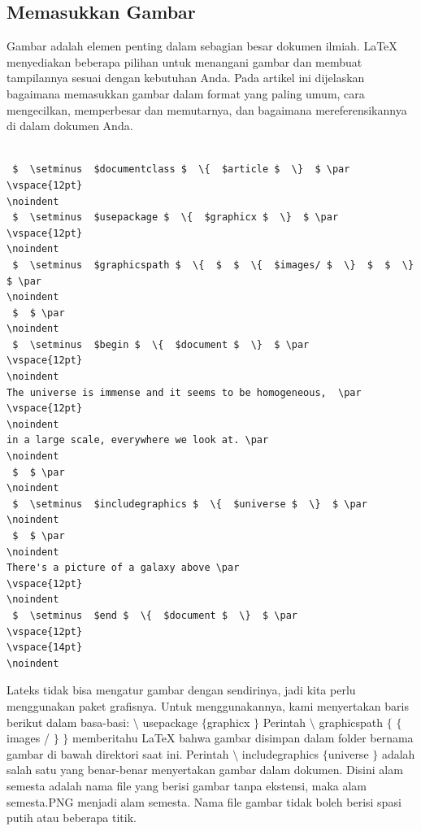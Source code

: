 \subsection {Memasukkan Gambar}
{\fontsize{10pt}{10pt}\selectfont  \hspace*{0.64in} Gambar adalah elemen penting dalam sebagian besar dokumen ilmiah. LaTeX menyediakan beberapa pilihan untuk menangani gambar dan membuat tampilannya sesuai dengan kebutuhan Anda. Pada artikel ini dijelaskan bagaimana memasukkan gambar dalam format yang paling umum, cara mengecilkan, memperbesar dan memutarnya, dan bagaimana mereferensikannya di dalam dokumen Anda.} \par
\vspace{12pt}
\noindent 
\begin{verbatim}

 $  \setminus  $documentclass $  \{  $article $  \}  $ \par
\vspace{12pt}
\noindent 
 $  \setminus  $usepackage $  \{  $graphicx $  \}  $ \par
\vspace{12pt}
\noindent 
 $  \setminus  $graphicspath $  \{  $  $  \{  $images/ $  \}  $  $  \}  $ \par
\noindent 
 $  $ \par
\noindent 
 $  \setminus  $begin $  \{  $document $  \}  $ \par
\vspace{12pt}
\noindent 
The universe is immense and it seems to be homogeneous,  \par
\vspace{12pt}
\noindent 
in a large scale, everywhere we look at. \par
\noindent 
 $  $ \par
\noindent 
 $  \setminus  $includegraphics $  \{  $universe $  \}  $ \par
\noindent 
 $  $ \par
\noindent 
There's a picture of a galaxy above \par
\vspace{12pt}
\noindent 
 $  \setminus  $end $  \{  $document $  \}  $ \par
\vspace{12pt}
\vspace{14pt}
\noindent 
\end{verbatim}
 \hspace*{0.5in} Lateks tidak bisa mengatur gambar dengan sendirinya, jadi kita perlu menggunakan paket grafisnya. Untuk menggunakannya, kami menyertakan baris berikut dalam basa-basi:  $  \setminus  $ usepackage  $  \{  $graphicx $  \}  $ Perintah  $  \setminus  $ graphicspath  $  \{  $ $  \{  $images / $  \}  $ $  \}  $ memberitahu LaTeX bahwa gambar disimpan dalam folder bernama gambar di bawah direktori saat ini. Perintah  $  \setminus  $ includegraphics  $  \{  $universe $  \}  $ adalah salah satu yang benar-benar menyertakan gambar dalam dokumen. Disini alam semesta adalah nama file yang berisi gambar tanpa ekstensi, maka alam semesta.PNG menjadi alam semesta. Nama file gambar tidak boleh berisi spasi putih atau beberapa titik. \par

